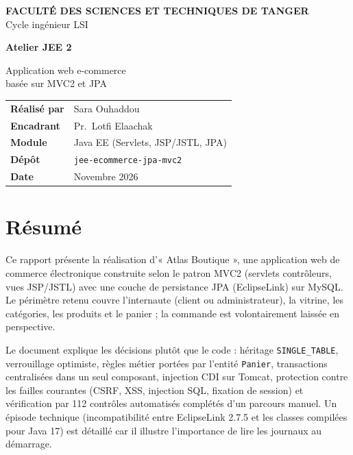 \documentclass[11pt,a4paper]{report}
\newcommand{\auteur}{Sara Ouhaddou}
\newcommand{\encadrant}{Pr.~Lotfi Elaachak}
\newcommand{\dateRapport}{Novembre 2026}
\newcommand{\nbChecks}{112}
\newcommand{\code}[1]{\texttt{#1}}
\begin{document}
\begin{titlepage}
\thispagestyle{empty}
\vspace*{1.2cm}
{\color{white}
{\small\textcolor{atlassaffron}{\bfseries FACULT\'E DES SCIENCES ET TECHNIQUES DE TANGER}}\\[2pt]
{\small Cycle ing\'enieur LSI}\\[1.4cm]
{\fontsize{30}{34}\selectfont\bfseries Atelier JEE 2\par}
\vspace{6pt}
{\Large Application web e-commerce\\ bas\'ee sur MVC2 et JPA\par}
}
\vfill
\begin{tabular}{@{}ll}
\textbf{R\'ealis\'e par} & \auteur\\[4pt]
\textbf{Encadrant} & \encadrant\\[4pt]
\textbf{Module} & Java EE (Servlets, JSP/JSTL, JPA)\\[4pt]
\textbf{D\'ep\^ot} & \texttt{jee-ecommerce-jpa-mvc2}\\[4pt]
\textbf{Date} & \dateRapport
\end{tabular}
\vspace{1.5cm}
\end{titlepage}

\chapter*{Résumé}
Ce rapport présente la réalisation d'« Atlas Boutique », une application web de commerce électronique construite
selon le patron MVC2 (servlets contrôleurs, vues JSP/JSTL) avec une couche de persistance JPA (EclipseLink)
sur MySQL. Le périmètre retenu couvre l'internaute (client ou administrateur), la vitrine, les catégories, les
produits et le panier ; la commande est volontairement laissée en perspective.

Le document explique les décisions plutôt que le code : héritage \code{SINGLE\_TABLE}, verrouillage optimiste,
règles métier portées par l'entité \code{Panier}, transactions centralisées dans un seul composant, injection CDI
sur Tomcat, protection contre les failles courantes (CSRF, XSS, injection SQL, fixation de session) et
vérification par \nbChecks{} contrôles automatisés complétés d'un parcours manuel. Un épisode technique
(incompatibilité entre EclipseLink 2.7.5 et les classes compilées pour Java 17) est détaillé car il illustre
l'importance de lire les journaux au démarrage.
\end{document}
